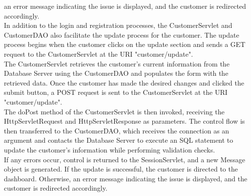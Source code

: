 an error message indicating the issue is displayed, and the customer is redirected accordingly.\\
In addition to the login and registration processes, the CustomerServlet and CustomerDAO also facilitate the update process for the customer. The update process begins when the customer clicks on the update section and sends a GET request to the CustomerServlet at the URI "customer/update".\\
The CustomerServlet retrieves the customer's current information from the Database Server using the CustomerDAO and populates the form with the retrieved data. Once the customer has made the desired changes and clicked the submit button, a POST request is sent to the CustomerServlet at the URI "customer/update". \\
The doPost method of the CustomerServlet is then invoked, receiving the HttpServletRequest and HttpServletResponse as parameters. The control flow is then transferred to the CustomerDAO, which receives the connection as an argument and contacts the Database Server to execute an SQL statement to update the customer's information while performing validation checks. \\
If any errors occur, control is returned to the SessionServlet, and a new Message object is generated. If the update is successful, the customer is directed to the dashboard. Otherwise, an error message indicating the issue is displayed, and the customer is redirected accordingly.\\

\newpage